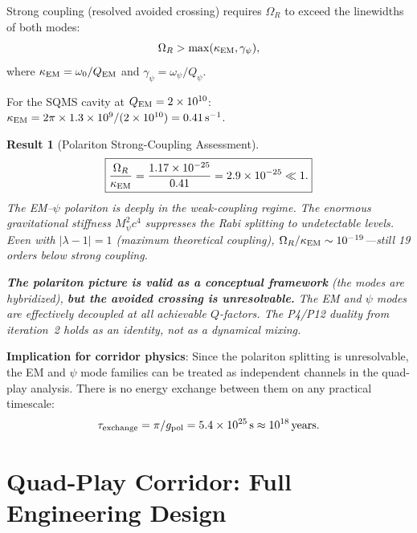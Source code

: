 \documentclass[aps,prd,twocolumn,superscriptaddress]{revtex4-2}
\newtheorem{result}{Result}
\begin{document}
Strong coupling (resolved avoided crossing) requires $\Omega_R$
to exceed the linewidths of both modes:
\begin{equation}
\Omega_R > \max(\kappa_{\rm EM}, \gamma_\psi),
\label{eq:strong-coupling}
\end{equation}
where $\kappa_{\rm EM} = \omega_0/Q_{\rm EM}$ and
$\gamma_\psi = \omega_\psi/Q_\psi$.

For the SQMS cavity at $Q_{\rm EM} = 2\times10^{10}$:
$\kappa_{\rm EM} = 2\pi\times1.3\times10^9/(2\times10^{10}) = 0.41\,\text{s}^{-1}$.

\begin{result}[Polariton Strong-Coupling Assessment]
\begin{equation}
\boxed{
\frac{\Omega_R}{\kappa_{\rm EM}} = \frac{1.17\times10^{-25}}{0.41}
= 2.9\times10^{-25} \ll 1.
}
\end{equation}
The EM--$\psi$ polariton is \emph{deeply} in the weak-coupling regime.
The enormous gravitational stiffness $M_\psi^2 c^4$ suppresses the
Rabi splitting to undetectable levels. Even with $|\lambda-1| = 1$
(maximum theoretical coupling), $\Omega_R/\kappa_{\rm EM} \sim
10^{-19}$---still 19 orders below strong coupling.

\textbf{The polariton picture is valid as a conceptual framework}
(the modes are hybridized), \textbf{but the avoided crossing is
unresolvable.} The EM and $\psi$ modes are effectively decoupled
at all achievable $Q$-factors. The P4/P12 duality from iteration~2
holds as an identity, not as a dynamical mixing.
\end{result}

\textbf{Implication for corridor physics}: Since the polariton
splitting is unresolvable, the EM and $\psi$ mode families can be
treated as independent channels in the quad-play analysis. There is
no energy exchange between them on any practical timescale:
\begin{equation}
\tau_{\rm exchange} = \pi/g_{\rm pol} = 5.4\times10^{25}\,\text{s}
\approx 10^{18}\,\text{years}.
\end{equation}


\section{Quad-Play Corridor: Full Engineering Design}
\label{sec:quad-play}
\end{document}
